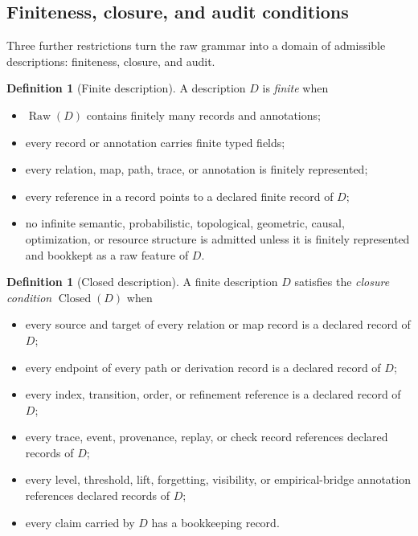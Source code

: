\documentclass[11pt]{article}
\theoremstyle{definition}
\newtheorem{definition}[theorem]{Definition}
\newcommand{\Raw}[1]{\ensuremath{\operatorname{Raw}\!\left(#1\right)}}
\newcommand{\Closed}[1]{\ensuremath{\operatorname{Closed}\!\left(#1\right)}}
\begin{document}
\subsection{Finiteness, closure, and audit conditions}\label{subsec:conditions}

Three further restrictions turn the raw grammar into a domain of
admissible descriptions: finiteness, closure, and audit.

\begin{definition}[Finite description]\label{def:finite}
A description \(D\) is \emph{finite} when
\begin{itemize}[topsep=2pt,itemsep=1pt]
  \item \(\Raw{D}\) contains finitely many records and annotations;
  \item every record or annotation carries finite typed fields;
  \item every relation, map, path, trace, or annotation is finitely
    represented;
  \item every reference in a record points to a declared finite record of
    \(D\);
  \item no infinite semantic, probabilistic, topological, geometric, causal,
    optimization, or resource structure is admitted unless it is finitely
    represented and bookkept as a raw feature of \(D\).
\end{itemize}
\end{definition}

\begin{definition}[Closed description]\label{def:closed}
A finite description \(D\) satisfies the \emph{closure condition} \(\Closed{D}\)
when
\begin{itemize}[topsep=2pt,itemsep=1pt]
  \item every source and target of every relation or map record is a declared
    record of \(D\);
  \item every endpoint of every path or derivation record is a declared record
    of \(D\);
  \item every index, transition, order, or refinement reference is a declared
    record of \(D\);
  \item every trace, event, provenance, replay, or check record references
    declared records of \(D\);
  \item every level, threshold, lift, forgetting, visibility, or
    empirical-bridge annotation references declared records of \(D\);
  \item every claim carried by \(D\) has a bookkeeping record.
\end{itemize}
\end{definition}
\end{document}
